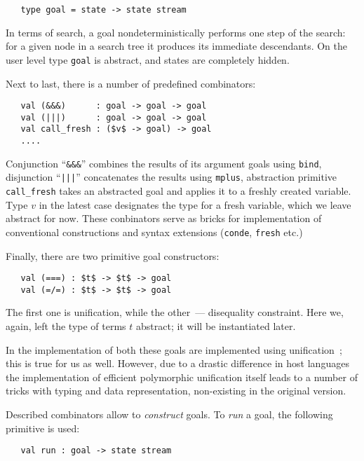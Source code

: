 \begin{lstlisting}
   type goal = state -> state stream
\end{lstlisting}

In terms of search, a goal nondeterministically performs one step of the search: for a given
node in a search tree it produces its immediate descendants. On the user level type \lstinline{goal}
is abstract, and states are completely hidden.

Next to last, there is a number of predefined combinators:

\begin{lstlisting}
   val (&&&)      : goal -> goal -> goal
   val (|||)      : goal -> goal -> goal
   val call_fresh : ($v$ -> goal) -> goal
   ....
\end{lstlisting}

Conjunction ``\lstinline{&&&}'' combines the results of its argument goals using \lstinline{bind},
disjunction ``\lstinline{|||}'' concatenates the results using \lstinline{mplus}, abstraction
primitive \lstinline{call_fresh} takes an abstracted goal and applies it to a freshly created
variable. Type $v$ in the latest case designates the type for a fresh variable, which we leave
abstract for now. These conbinators serve as bricks for implementation of conventional
\miniKanren constructions and syntax extensions (\lstinline{conde}, \lstinline{fresh} etc.)

Finally, there are two primitive goal constructors:

\begin{lstlisting}
   val (===) : $t$ -> $t$ -> goal
   val (=/=) : $t$ -> $t$ -> goal
\end{lstlisting}

The first one is unification, while the other~--- disequality constraint. Here we, again, left
the type of terms $t$ abstract; it will be instantiated later.

In the implementation of \miniKanren both these goals are implemented using unification~\cite{CKanren}; this
is true for us as well. However, due to a drastic difference in host languages the implementation of
efficient polymorphic unification itself leads to a number of tricks with typing and data representation,
non-existing in the original version.

Described combinators allow to \emph{construct} goals. To \emph{run} a goal, the following
primitive is used:

\begin{lstlisting}
   val run : goal -> state stream
\end{lstlisting}

